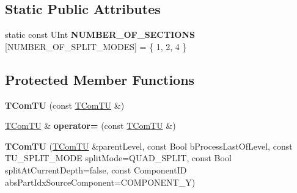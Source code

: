 \subsection*{Static Public Attributes}
\begin{DoxyCompactItemize}
\item 
\mbox{\label{class_t_com_t_u_a00377729a1433465afc5338043399a3f}} 
static const U\+Int {\bfseries N\+U\+M\+B\+E\+R\+\_\+\+O\+F\+\_\+\+S\+E\+C\+T\+I\+O\+NS} \mbox{[}N\+U\+M\+B\+E\+R\+\_\+\+O\+F\+\_\+\+S\+P\+L\+I\+T\+\_\+\+M\+O\+D\+ES\mbox{]} = \{ 1, 2, 4 \}
\end{DoxyCompactItemize}
\subsection*{Protected Member Functions}
\begin{DoxyCompactItemize}
\item 
\mbox{\label{class_t_com_t_u_acf8261bb64e704764954607ff74fc139}} 
{\bfseries T\+Com\+TU} (const \hyperlink{class_t_com_t_u}{T\+Com\+TU} \&)
\item 
\mbox{\label{class_t_com_t_u_a391ed4f84237337a696c310666e16e63}} 
\hyperlink{class_t_com_t_u}{T\+Com\+TU} \& {\bfseries operator=} (const \hyperlink{class_t_com_t_u}{T\+Com\+TU} \&)
\item 
\mbox{\label{class_t_com_t_u_a19f7ac9c4490fb9e012265d40f205345}} 
{\bfseries T\+Com\+TU} (\hyperlink{class_t_com_t_u}{T\+Com\+TU} \&parent\+Level, const Bool b\+Process\+Last\+Of\+Level, const T\+U\+\_\+\+S\+P\+L\+I\+T\+\_\+\+M\+O\+DE split\+Mode=Q\+U\+A\+D\+\_\+\+S\+P\+L\+IT, const Bool split\+At\+Current\+Depth=false, const Component\+ID abs\+Part\+Idx\+Source\+Component=C\+O\+M\+P\+O\+N\+E\+N\+T\+\_\+Y)
\end{DoxyCompactItemize}
